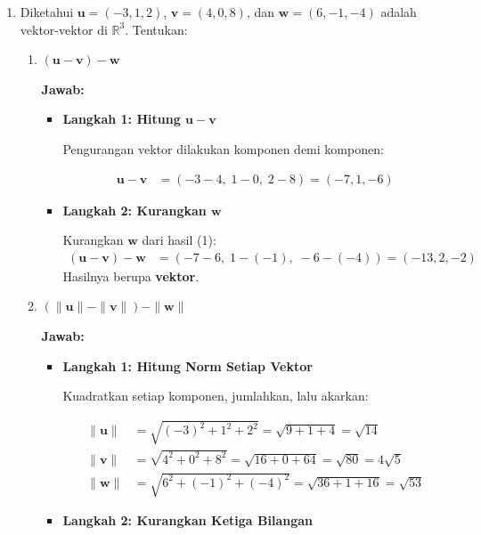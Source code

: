 \documentclass[10pt,a4paper]{article}
\newcounter{eqblock}
\newcommand{\reseteq}{%
  \stepcounter{eqblock}%
  \setcounter{equation}{0}%
  \renewcommand{\theHequation}{\arabic{eqblock}.\arabic{equation}}%
}
\begin{document}
\begin{enumerate}
\item Diketahui $\mathbf{u} = (-3, 1, 2)$, $\mathbf{v} = (4, 0, 8)$, dan $\mathbf{w} = (6, -1, -4)$ adalah vektor-vektor di $\mathbb{R}^3$. Tentukan:
\begin{enumerate}

\item $(\mathbf{u} - \mathbf{v}) - \mathbf{w}$

\textbf{Jawab:}
\begin{itemize}
\item \textbf{Langkah 1: Hitung $\mathbf{u} - \mathbf{v}$}

Pengurangan vektor dilakukan komponen demi komponen:
\reseteq
\begin{align}
\mathbf{u} - \mathbf{v} &= (-3 - 4,\; 1 - 0,\; 2 - 8) = (-7, 1, -6)
\end{align}

\item \textbf{Langkah 2: Kurangkan $\mathbf{w}$}

Kurangkan $\mathbf{w}$ dari hasil (1):
\begin{align}
(\mathbf{u} - \mathbf{v}) - \mathbf{w} &= (-7 - 6,\; 1 - (-1),\; -6 - (-4)) = (-13, 2, -2)
\end{align}
Hasilnya berupa \textbf{vektor}.
\end{itemize}

\item $(\|\mathbf{u}\| - \|\mathbf{v}\|) - \|\mathbf{w}\|$

\textbf{Jawab:}
\begin{itemize}
\item \textbf{Langkah 1: Hitung Norm Setiap Vektor}

Kuadratkan setiap komponen, jumlahkan, lalu akarkan:
\reseteq
\begin{align}
\|\mathbf{u}\| &= \sqrt{(-3)^2 + 1^2 + 2^2} = \sqrt{9 + 1 + 4} = \sqrt{14} \\
\|\mathbf{v}\| &= \sqrt{4^2 + 0^2 + 8^2} = \sqrt{16 + 0 + 64} = \sqrt{80} = 4\sqrt{5} \\
\|\mathbf{w}\| &= \sqrt{6^2 + (-1)^2 + (-4)^2} = \sqrt{36 + 1 + 16} = \sqrt{53}
\end{align}

\item \textbf{Langkah 2: Kurangkan Ketiga Bilangan}


\end{itemize}
\end{enumerate}
\end{enumerate}
\end{document}
